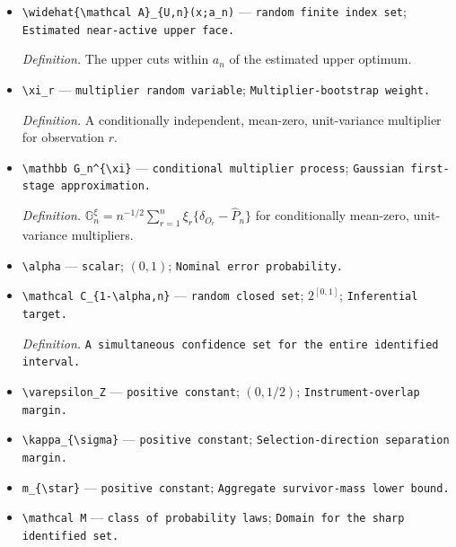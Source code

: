 \documentclass{article}
\begin{document}
\begin{itemize}
  \item \texttt{\textbackslash{}\allowbreak{}widehat\{\textbackslash{}\allowbreak{}mathcal A\}\allowbreak{}\_\allowbreak{}\{U,\allowbreak{}n\}\allowbreak{}(x;\allowbreak{}a\_\allowbreak{}n)} --- \texttt{random finite index set}; \texttt{Estimated near-\allowbreak{}active upper face.}
  \par\smallskip\noindent\emph{Definition.} The upper cuts within \(a_n\) of the estimated upper optimum.
  \item \texttt{\textbackslash{}\allowbreak{}xi\_\allowbreak{}r} --- \texttt{multiplier random variable}; \texttt{Multiplier-\allowbreak{}bootstrap weight.}
  \par\smallskip\noindent\emph{Definition.} A conditionally independent, mean-zero, unit-variance multiplier for observation \(r\).
  \item \texttt{\textbackslash{}\allowbreak{}mathbb G\_\allowbreak{}n\textasciicircum{}\{\textbackslash{}\allowbreak{}xi\}\allowbreak{}} --- \texttt{conditional multiplier process}; \texttt{Gaussian first-\allowbreak{}stage approximation.}
  \par\smallskip\noindent\emph{Definition.} \(\mathbb G_n^{\xi}=n^{-1/2}\sum_{r=1}^n\xi_r\{\delta_{O_r}-\widehat P_n\}\) for conditionally mean-zero, unit-variance multipliers.
  \item \texttt{\textbackslash{}\allowbreak{}alpha} --- \texttt{scalar}; \((0,1)\); \texttt{Nominal error probability.}
  \item \texttt{\textbackslash{}\allowbreak{}mathcal C\_\allowbreak{}\{1-\allowbreak{}\textbackslash{}\allowbreak{}alpha,\allowbreak{}n\}\allowbreak{}} --- \texttt{random closed set}; \(2^{[0,1]}\); \texttt{Inferential target.}
  \par\smallskip\noindent\emph{Definition.} \texttt{A simultaneous confidence set for the entire identified interval.}
  \item \texttt{\textbackslash{}\allowbreak{}varepsilon\_\allowbreak{}Z} --- \texttt{positive constant}; \((0,1/2)\); \texttt{Instrument-\allowbreak{}overlap margin.}
  \item \texttt{\textbackslash{}\allowbreak{}kappa\_\allowbreak{}\{\textbackslash{}\allowbreak{}sigma\}\allowbreak{}} --- \texttt{positive constant}; \texttt{Selection-\allowbreak{}direction separation margin.}
  \item \texttt{m\_\allowbreak{}\{\textbackslash{}\allowbreak{}star\}\allowbreak{}} --- \texttt{positive constant}; \texttt{Aggregate survivor-\allowbreak{}mass lower bound.}
  \item \texttt{\textbackslash{}\allowbreak{}mathcal M} --- \texttt{class of probability laws}; \texttt{Domain for the sharp identified set.}

\end{itemize}
\end{document}
